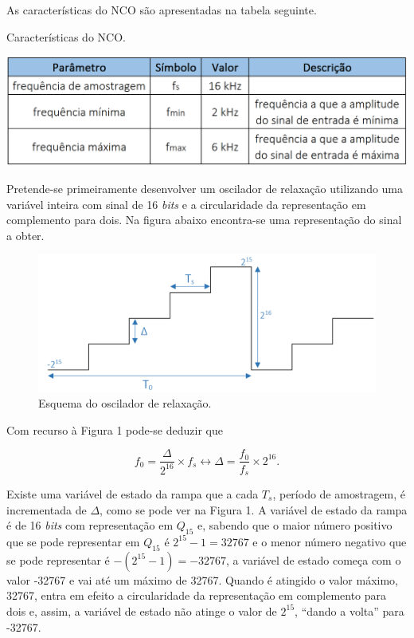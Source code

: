 \documentclass[11pt]{article}
\numberwithin{equation}{section}
\begin{document}
As características do NCO são apresentadas na tabela seguinte.

\begin{table}[H]
	\centering
	\caption{Características do NCO.}
	\vspace{-1.5mm}
	\includegraphics[keepaspectratio=true, scale=0.45]{tabelas/tabela1}
\end{table}

Pretende-se primeiramente desenvolver um oscilador de relaxação utilizando uma variável inteira com sinal de 16 \textit{bits} e a circularidade da representação em complemento para dois. Na figura abaixo encontra-se uma representação do sinal a obter.

\begin{figure}[H]
	\centering
	\includegraphics[keepaspectratio=true, scale=0.37]{teoricas/rampa}
	\caption{Esquema do oscilador de relaxação.}
	\vspace{-0.8em}
\end{figure}

Com recurso à Figura 1 pode-se deduzir que

\vspace{-3mm}
\begin{equation}
f_{0} = \frac{\Delta}{2^{16}} \times f_{s} \leftrightarrow \Delta = \frac{f_{0}}{f_{s}} \times 2^{16}.
\end{equation}

\vspace{1mm}
Existe uma variável de estado da rampa que a cada $T_{s}$, período de amostragem, é incrementada de $\Delta$, como se pode ver na Figura 1. A variável de estado da rampa é de 16 \textit{bits} com representação em $Q_{15}$ e, sabendo que o maior número positivo que se pode representar em $Q_{15}$ é $2^{15} - 1 = 32767$ e o menor número negativo que se pode representar é  $-(2^{15} - 1) = -32767$, a variável de estado começa com o valor -32767 e vai até um máximo de 32767. Quando é atingido o valor máximo, 32767, entra em efeito a circularidade da representação em complemento para dois e, assim, a variável de estado não atinge o valor de $2^{15}$, ``dando a volta'' para -32767. 
\end{document}

